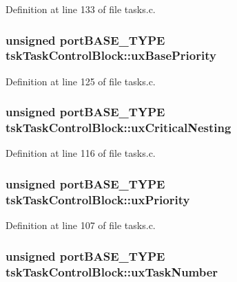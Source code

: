 Definition at line 133 of file tasks.\-c.

\hypertarget{structtsk_task_control_block_a50471e54a6f22994f835c0b2b358d006}{
\subsubsection[{ux\-Base\-Priority}]{\setlength{\rightskip}{0pt plus 5cm}unsigned port\-B\-A\-S\-E\-\_\-\-T\-Y\-P\-E tsk\-Task\-Control\-Block\-::ux\-Base\-Priority}}\label{structtsk_task_control_block_a50471e54a6f22994f835c0b2b358d006}


Definition at line 125 of file tasks.\-c.

\hypertarget{structtsk_task_control_block_a608d77a8a8fa5080525c900ceb7a540b}{
\subsubsection[{ux\-Critical\-Nesting}]{\setlength{\rightskip}{0pt plus 5cm}unsigned port\-B\-A\-S\-E\-\_\-\-T\-Y\-P\-E tsk\-Task\-Control\-Block\-::ux\-Critical\-Nesting}}\label{structtsk_task_control_block_a608d77a8a8fa5080525c900ceb7a540b}


Definition at line 116 of file tasks.\-c.

\hypertarget{structtsk_task_control_block_a82357f7be508ac5d27ae7968cddde6da}{
\subsubsection[{ux\-Priority}]{\setlength{\rightskip}{0pt plus 5cm}unsigned port\-B\-A\-S\-E\-\_\-\-T\-Y\-P\-E tsk\-Task\-Control\-Block\-::ux\-Priority}}\label{structtsk_task_control_block_a82357f7be508ac5d27ae7968cddde6da}


Definition at line 107 of file tasks.\-c.

\hypertarget{structtsk_task_control_block_a9ec9718baa5b502b9c8f2558bd41ea9d}{
\subsubsection[{ux\-Task\-Number}]{\setlength{\rightskip}{0pt plus 5cm}unsigned port\-B\-A\-S\-E\-\_\-\-T\-Y\-P\-E tsk\-Task\-Control\-Block\-::ux\-Task\-Number}}\label{structtsk_task_control_block_a9ec9718baa5b502b9c8f2558bd41ea9d}


